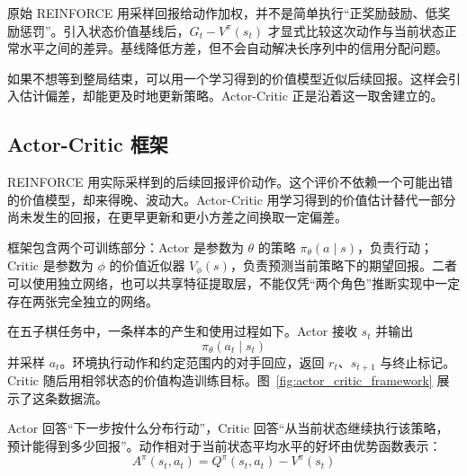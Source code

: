 \documentclass[UTF8,a4paper,zihao=-4,oneside,openany]{ctexbook}
\begin{document}
\begin{importantnote}
原始 REINFORCE 用采样回报给动作加权，并不是简单执行“正奖励鼓励、低奖励惩罚”。引入状态价值基线后，$G_t-V^\pi(s_t)$ 才显式比较这次动作与当前状态正常水平之间的差异。基线降低方差，但不会自动解决长序列中的信用分配问题。
\end{importantnote}

如果不想等到整局结束，可以用一个学习得到的价值模型近似后续回报。这样会引入估计偏差，却能更及时地更新策略。Actor-Critic 正是沿着这一取舍建立的。

\subsection{Actor-Critic 框架}

REINFORCE 用实际采样到的后续回报评价动作。这个评价不依赖一个可能出错的价值模型，却来得晚、波动大。Actor-Critic 用学习得到的价值估计替代一部分尚未发生的回报，在更早更新和更小方差之间换取一定偏差。

框架包含两个可训练部分：Actor 是参数为 $\theta$ 的策略 $\pi_\theta(a\mid s)$，负责行动；Critic 是参数为 $\phi$ 的价值近似器 $V_\phi(s)$，负责预测当前策略下的期望回报。二者可以使用独立网络，也可以共享特征提取层，不能仅凭“两个角色”推断实现中一定存在两张完全独立的网络。

在五子棋任务中，一条样本的产生和使用过程如下。Actor 接收 $s_t$ 并输出
\begin{equation}
\pi_{\theta}(a_t\mid s_t)
\end{equation}
并采样 $a_t$。环境执行动作和约定范围内的对手回应，返回 $r_t$、$s_{t+1}$ 与终止标记。Critic 随后用相邻状态的价值构造训练目标。图~\ref{fig:actor_critic_framework} 展示了这条数据流。

%       

Actor 回答“下一步按什么分布行动”，Critic 回答“从当前状态继续执行该策略，预计能得到多少回报”。动作相对于当前状态平均水平的好坏由优势函数表示：
\begin{equation}
A^{\pi}(s_t,a_t)
=
Q^{\pi}(s_t,a_t)
-
V^{\pi}(s_t)
\end{equation}
\end{document}
